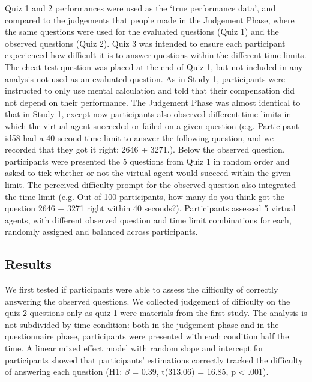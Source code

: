 \documentclass[10pt,letterpaper]{article}
\begin{document}
Quiz 1 and 2 performances were used as the ‘true performance data’, and compared to the judgements that people made in the Judgement Phase, where the same questions were used for the evaluated questions (Quiz 1) and the observed questions (Quiz 2). Quiz 3 was intended to ensure each participant experienced how difficult it is to answer questions within the different time limits. The cheat-test question was placed at the end of Quiz 1, but not included in any analysis not used as an evaluated question. As in Study 1, participants were instructed to only use mental calculation and told that their compensation did not depend on their performance.
The Judgement Phase was almost identical to that in Study 1, except now participants also observed different time limits in which the virtual agent succeeded or failed on a given question (e.g. Participant id58 had a 40 second time limit to answer the following question, and we recorded that they got it right: 2646 + 3271.). Below the observed question, participants were presented the 5 questions from Quiz 1 in random order and asked to tick whether or not the virtual agent would succeed within the given limit. The perceived difficulty prompt for the observed question also integrated the time limit (e.g. Out of 100 participants, how many do you think got the question 2646 + 3271 right within 40 seconds?). Participants assessed 5 virtual agents, with different observed question and time limit combinations for each, randomly assigned and balanced across participants.

\subsection{Results}\label{results-2}

We first tested if participants were able to assess the difficulty of correctly answering the observed questions. We collected judgement of difficulty on the quiz 2 questions only as quiz 1 were materials from the first study. The analysis is not subdivided by time condition: both in the judgement phase and in the questionnaire phase, participants were presented with each condition half the time. A linear mixed effect model with random slope and intercept for participants showed that participants' estimations correctly tracked the difficulty of answering each question (H1: \(\beta\) = 0.39, t(313.06) = 16.85, p \textless{} .001).
\end{document}
